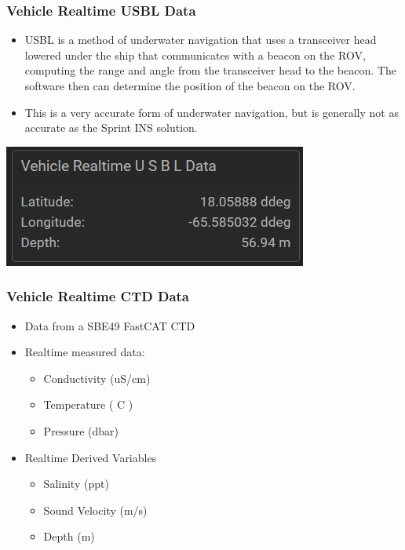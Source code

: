 \documentclass[
  letterpaper,
  DIV=11,
  numbers=noendperiod]{scrreprt}
\providecommand{\tightlist}{%
  \setlength{\itemsep}{0pt}\setlength{\parskip}{0pt}}\usepackage{longtable,booktabs,array}
\begin{document}
\hypertarget{vehicle-realtime-usbl-data}{%
\subsubsection{Vehicle Realtime USBL
Data}\label{vehicle-realtime-usbl-data}}

\begin{itemize}
\tightlist
\item
  USBL is a method of underwater navigation that uses a transceiver head
  lowered under the ship that communicates with a beacon on the ROV,
  computing the range and angle from the transceiver head to the beacon.
  The software then can determine the position of the beacon on the ROV.
\item
  This is a very accurate form of underwater navigation, but is
  generally not as accurate as the Sprint INS solution.
\end{itemize}

\includegraphics{images/image1.png}

\hypertarget{vehicle-realtime-ctd-data}{%
\subsubsection{Vehicle Realtime CTD
Data}\label{vehicle-realtime-ctd-data}}

\begin{itemize}
\tightlist
\item
  Data from a SBE49 FastCAT CTD
\item
  Realtime measured data:

  \begin{itemize}
  \tightlist
  \item
    Conductivity (uS/cm)
  \item
    Temperature ( C )
  \item
    Pressure (dbar)
  \end{itemize}
\item
  Realtime Derived Variables

  \begin{itemize}
  \tightlist
  \item
    Salinity (ppt)
  \item
    Sound Velocity (m/s)
  \item
    Depth (m)
  \end{itemize}
\end{itemize}
\end{document}
